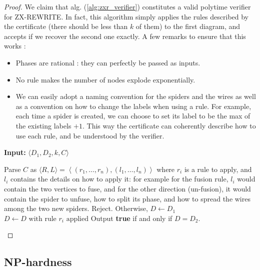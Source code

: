 \documentclass[journal,onecolumn]{IEEEtran}
\begin{document}
\begin{proof}
	We claim that alg. (\ref{alg:zxr_verifier}) constitutes a valid polytime verifier for \textsc{ZX-REWRITE}.	In fact, this algorithm simply applies the rules described by the certificate (there should 	be less than $k$ of them) to the first diagram, and accepts if we recover the second one exactly. A few remarks to ensure that this works :
	\begin{itemize}
		\item Phases are rational : they can perfectly be passed as inputs.
    		\item No rule makes the number of nodes explode exponentially.
    		\item We can easily adopt a naming convention for the spiders and the wires as well as a convention on how to change the labels when using a rule. For example, each time a spider is created, we can choose to set its label to be the max of the existing labels $+ 1$. This way the certificate can coherently describe how to use each rule, and be understood by the verifier.
	\end{itemize}

\begin{algorithm}[H]
\caption{Verifier $V$}
\label{alg:zxr_verifier}
\hspace*{\algorithmicindent} \textbf{Input:} $\langle D_1, D_2, k, C \rangle$
\begin{algorithmic}[1]
\State Parse $C$ as $\langle R, L \rangle = \left\langle (r_1, \dots, r_n), (l_1, \dots, l_n) \right\rangle$ where $r_i$ is a rule to apply, and $l_i$ contains the details on how to apply it: for example for the fusion rule, $l_i$ would contain the two vertices to fuse, and for the other direction (un-fusion), it would contain the spider to unfuse, how to split its phase, and how to spread the wires among the two new spiders.
    \State Reject.
\EndIf
\State Otherwise, $D \gets D_1$
    \State $D \gets D \text{ with rule } r_i \text{ applied}$
\EndFor
\State Output \textbf{true} if and only if $D = D_2$.
\end{algorithmic}
\end{algorithm}

\end{proof}

\subsection{\textsc{NP}-hardness}
\end{document}
